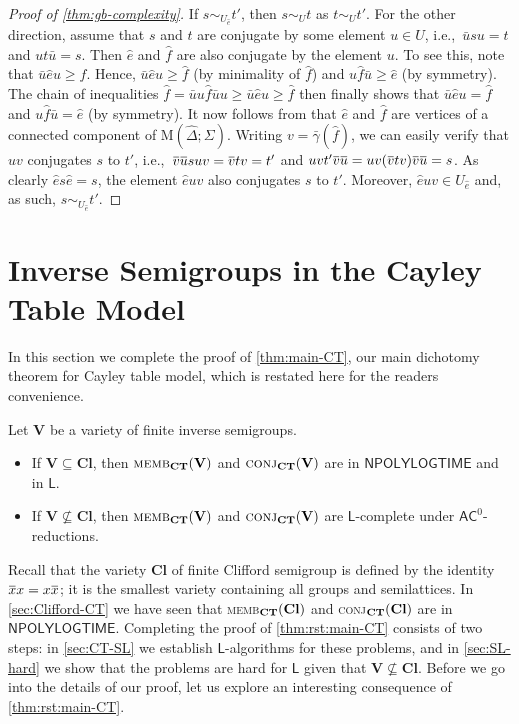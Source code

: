 \documentclass[anonymous,letter,UKenglish,cleveref,autoref,thm-restate]{lipics-v2021}
\renewcommand{\geq}{\geqslant}
\renewcommand{\ge}{\geq}
\newcommand{\ie}{i.e.,~}
\newcommand{\sse}{\subseteq}
\newcommand{\NPOLYLOGTIME}{\ensuremath{\mathsf{NPOLYLOGTIME}}\xspace}
\newcommand{\ACz}{\ensuremath{\mathsf{AC}^0}\xspace}
\newcommand{\LOGSPACE}{\ensuremath{\mathsf{L}}\xspace}
\newcommand{\vV}{\ensuremath{\mathbf{V}}}
\newcommand{\vCl}{\ensuremath{\mathbf{Cl}}}
\newcommand\nindent{.5pt}
\newcommand\noverline[1]{\kern\nindent\overline{\kern-\nindent#1\kern-\nindent}\kern\nindent}
\newcommand{\ov}[1]{\noverline{#1}}
\theoremstyle{plain}
\theoremstyle{plain}
\newcommand{\dMemb}[2][]{\textup{\textsc{memb${}_{\mathbf{#1}}\expandafter\ifx\expandafter\relax\detokenize{#2}\relax\else(#2)\fi$}}}
\newcommand{\dConj}[2][]{\textup{\textsc{conj${}_{\mathbf{#1}}\expandafter\ifx\expandafter\relax\detokenize{#2}\relax\else(#2)\fi$}}}
\begin{document}
\begin{proof}[Proof of \cref{thm:gb-complexity}]
  If $s \sim_{U_{\hat e}} t'$, then $s \sim_U t$ as $t \sim_U t'$.
	For the other direction, assume that $s$ and $t$ are conjugate by some element $u \in U$, \ie $\bar us u = t$ and $u t \bar u = s$.
  Then $\hat e$ and $\hat f$ are also conjugate by the element $u$.
  To see this, note that $\bar u \hat e u \ge f$.
  Hence, $\bar u \hat e u \ge \hat f$ (by minimality of $\hat f$) and $u \hat f \bar u \ge \hat e$ (by symmetry).
  The chain of inequalities $\hat f = \bar u u \hat f \bar u u \ge \bar u \hat e  u \ge \hat f$ then finally shows that $\bar u \hat e  u = \hat f$ and $u \hat f \bar u = \hat e$ (by symmetry).
	It now follows from  that $\hat e$ and $\hat f$ are vertices of a connected component of $\mathrm{M}(\hat \Delta; \Sigma)$.
  Writing $v = \bar\gamma(\hat f)$, we can easily verify that $uv$ conjugates $s$ to $t'$, \ie $\ov{v}\ov{u} s uv = \ov v t v = t'$ and $uv t' \ov{v}\ov{u} = uv (\ov v t v) \ov{v}\ov{u} = s$.
  As clearly $\hat e s \hat e = s$, the element $\hat e uv$ also conjugates $s$ to $t'$.
  Moreover, $\hat e u v \in U_{\hat e}$ and, as such, $s \sim_{U_{\hat e}} t'$.
\end{proof}



\section{Inverse Semigroups in the Cayley Table Model}\label{sec:SL-Cayley}



In this section we complete the proof of \cref{thm:main-CT}, our main dichotomy theorem for Cayley table model, which is restated here for the readers convenience.


\begin{theorem}\label{thm:rst:main-CT}
	Let $\vV$ be a variety of finite inverse semigroups. 
	\begin{itemize}
		\item If $\vV \sse \vCl$, then $\dMemb[CT]{\vV}$ and $\dConj[CT]{\vV}$ are in \NPOLYLOGTIME and in \LOGSPACE.
		\item If $\vV \not\sse \vCl$, then $\dMemb[CT]{\vV}$ and $\dConj[CT]{\vV}$ are \LOGSPACE-complete under \ACz-reductions.
	\end{itemize}
\end{theorem}

Recall that the variety $\vCl$ of finite Clifford semigroup is defined by the identity $\ov x x = x \ov x$; it is the smallest variety containing all groups and semilattices. 
In \cref{sec:Clifford-CT} we have seen that \dMemb[CT]{\vCl} and \dConj[CT]{\vCl} are in \NPOLYLOGTIME.
Completing the proof of \cref{thm:rst:main-CT} consists of two steps: in \cref{sec:CT-SL} we establish \LOGSPACE-algorithms for these problems, and in \cref{sec:SL-hard} we show that the problems are hard for \LOGSPACE given that $\vV \not\sse \vCl$.
Before we go into the details of our proof, let us explore an interesting consequence of \cref{thm:rst:main-CT}.
\end{document}
